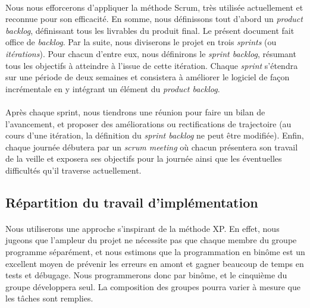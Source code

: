 \documentclass{report}
\begin{document}
\paragraph{}
\hspace{4mm}\textnormal{Nous nous efforcerons d'appliquer la m\'{e}thode Scrum, tr\`{e}s utilis\'{e}e actuellement et reconnue pour son efficacit\'{e}.
En somme, nous d\'{e}finissons tout d'abord un \textit{product backlog}, d\'{e}finissant tous les livrables du produit final. Le pr\'{e}sent
document fait office de \textit{backlog}. Par la suite, nous diviserons le projet en trois \textit{sprints} (ou \textit{it\'{e}rations}).
Pour chacun d'entre eux, nous d\'{e}finirons le \textit{sprint backlog}, r\'{e}sumant tous les objectifs \`{a} atteindre
\`{a} l'issue de cette it\'{e}ration.
Chaque \textit{sprint} s'\'{e}tendra sur une p\'{e}riode de deux semaines et consistera \`{a} am\'{e}liorer le logiciel
de fa\c{c}on incr\'{e}mentale en y int\'{e}grant un \'{e}l\'{e}ment du \textit{product backlog}.}

\paragraph{}
\hspace{4mm}\textnormal{Apr\`{e}s chaque sprint, nous tiendrons une r\'{e}union pour faire un bilan de l'avancement, et proposer des am\'{e}liorations ou rectifications de trajectoire
(au cours d'une it\'{e}ration, la d\'{e}finition du \textit{sprint backlog} ne peut \^{e}tre modifi\'{e}e).
Enfin, chaque journ\'{e}e d\'{e}butera par un \textit{scrum meeting} o\`{u} chacun pr\'{e}sentera son travail de la veille
et exposera ses objectifs pour la journ\'{e}e ainsi que les \'{e}ventuelles difficult\'{e}s qu'il traverse actuellement.}

\subsection{R\'{e}partition du travail d'impl\'{e}mentation}

\paragraph{}
\hspace{4mm}\textnormal{Nous utiliserons une approche s'inspirant de la m\'{e}thode XP. En effet, nous jugeons que l'ampleur du projet ne n\'{e}cessite pas
que chaque membre du groupe programme s\'{e}par\'{e}ment, et nous estimons que la programmation en bin\^{o}me est un excellent
moyen de pr\'{e}venir les erreurs en amont et gagner beaucoup de temps en tests et d\'{e}bugage. Nous programmerons donc par bin\^{o}me, et le cinqui\`{e}me du groupe
d\'{e}veloppera seul. La composition des groupes pourra varier \`{a} mesure que les t\^{a}ches sont remplies.}
\end{document}
